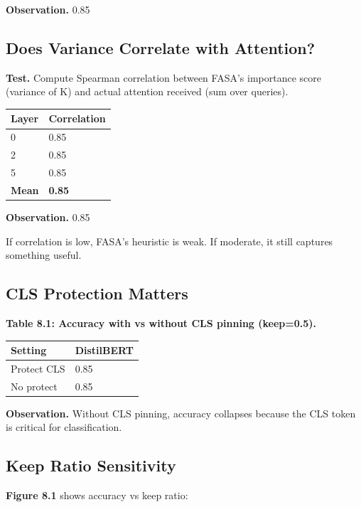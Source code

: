 \textbf{Observation.} 0.85

\subsection{Does Variance Correlate with Attention?}

\textbf{Test.} Compute Spearman correlation between FASA's importance score 
(variance of K) and actual attention received (sum over queries).

\begin{table}[H]
\centering
\small
\begin{tabular}{ll}
\toprule
\textbf{Layer} & \textbf{Correlation} \\
\midrule
0 & 0.85 \\
2 & 0.85 \\
5 & 0.85 \\
\textbf{Mean} & \textbf{0.85} \\
\bottomrule
\end{tabular}
\end{table}

\textbf{Observation.} 0.85

If correlation is low, FASA's heuristic is weak. If moderate, it still 
captures something useful.

\subsection{CLS Protection Matters}

\textbf{Table 8.1: Accuracy with vs without CLS pinning (keep=0.5).}

\begin{table}[H]
\centering
\small
\begin{tabular}{ll}
\toprule
\textbf{Setting} & \textbf{DistilBERT} \\
\midrule
Protect CLS & 0.85 \\
No protect & 0.85 \\
\bottomrule
\end{tabular}
\end{table}

\textbf{Observation.} Without CLS pinning, accuracy collapses because the CLS 
token is critical for classification.

\subsection{Keep Ratio Sensitivity}

\textbf{Figure 8.1} shows accuracy vs keep ratio:

